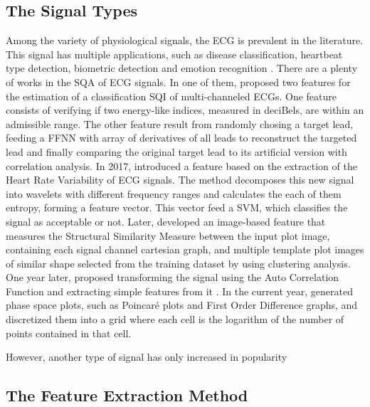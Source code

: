 \subsection{The Signal Types}

Among the variety of physiological signals, the \acrfull{ECG} is prevalent in the literature. This signal has multiple applications, such as disease classification, heartbeat type detection, biometric detection and emotion recognition \cite{ecg-1}. There are a plenty of works in the \acrshort{SQA} of ECG signals. In one of them, \citeauthor{ecg-2} proposed two features for the estimation of a classification \acrshort{SQI} of multi-channeled \acrshort{ECG}s. One feature consists of verifying if two energy-like indices, measured in deciBels, are within an admissible range. The other feature result from randomly chosing a target lead, feeding a \acrshort{FFNN} with array of derivatives of all leads to reconstruct the targeted lead and finally comparing the original target lead to its artificial version with correlation analysis. In 2017, \citeauthor{ecg-3} introduced a feature based on the extraction of the Heart Rate Variability of \acrshort{ECG} signals. The method decomposes this new signal into wavelets with different frequency ranges and calculates the each of them entropy, forming a feature vector. This vector feed a \acrshort{SVM}, which classifies the signal as acceptable or not. Later, \citeauthor{ecg-4} developed an image-based feature that measures the Structural Similarity Measure between the input plot image, containing each signal channel cartesian graph, and multiple template plot images of similar shape selected from the training dataset by using clustering analysis. One year later, \citeauthor{ecg-5} proposed transforming the signal using the Auto Correlation Function and extracting simple features from it \cite{ecg-5}. In the current year, \citeauthor{ecg-6} generated phase space plots, such as Poincaré plots and First Order Difference graphs, and discretized them into a grid where each cell is the logarithm of the number of points contained in that cell\cite{ecg-6}. 

However, another type of signal has only increased in popularity 

\subsection{The Feature Extraction Method}
\label{sec:feature}

